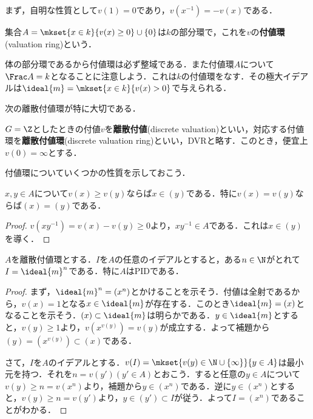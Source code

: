 まず，自明な性質として$v(1)=0$であり，$v(x^{-1})=-v(x)$である．

\begin{defi}
	集合$A=\mkset{x\in k}{v(x)\geq0}\cup\{0\}$は$k$の部分環で，これを$v$の\textbf{付値環}(valuation ring)という．
\end{defi}

体の部分環であるから付値環は必ず整域である．また付値環$A$について$\Frac A=k$となることに注意しよう．これは$k$の付値環をなす．その極大イデアルは$\ideal{m}=\mkset{x\in k}{v(x)>0}$で与えられる．

次の離散付値環が特に大切である．
\begin{defi}[離散付値]
	$G=\Z$としたときの付値$v$を\textbf{離散付値}(discrete valuation)といい，対応する付値環を\textbf{離散付値環}(discrete valuation ring)といい，DVRと略す．このとき，便宜上$v(0)=\infty$とする．
\end{defi}

付値環についていくつかの性質を示しておこう．

\begin{lem}
	$x,y\in A$について$v(x)\geq v(y)$ならば$x\in (y)$である．特に$v(x)=v(y)$ならば$(x)=(y)$である．
\end{lem}

\begin{proof}
	$v(xy^{-1})=v(x)-v(y)\geq0$より，$xy^{-1}\in A$である．これは$x\in (y)$を導く．
\end{proof}

\begin{prop}\label{prop:離散付値環の性質}
	$A$を離散付値環とする．$I$を$A$の任意のイデアルとすると，ある$n\in\N$がとれて$I=\ideal{m}^n$である．特に$A$はPIDである．
\end{prop}

\begin{proof}
	まず，$\ideal{m}^n=(x^n)$とかけることを示そう．付値は全射であるから，$v(x)=1$となる$x\in\ideal{m}$が存在する．このとき$\ideal{m}=(x)$となることを示そう．$(x)\subset\ideal{m}$は明らかである．$y\in\ideal{m}$とすると，$v(y)\geq1$より，$v(x^{v(y)})=v(y)$が成立する．よって補題から$(y)=(x^{v(y)})\subset(x)$である．
	
	さて，$I$を$A$のイデアルとする．$v(I)=\mkset{v(y)\in\N\cup\{\infty\}}{y\in A}$は最小元を持つ．それを$n=v(y') (y'\in A)$とおこう．すると任意の$y\in A$について$v(y)\geq n=v(x^n)$より，補題から$y\in (x^n)$である．逆に$y\in(x^n)$とすると，$v(y)\geq n=v(y')$より，$y\in(y')\subset I$が従う．よって$I=(x^n)$であることがわかる．
\end{proof}

